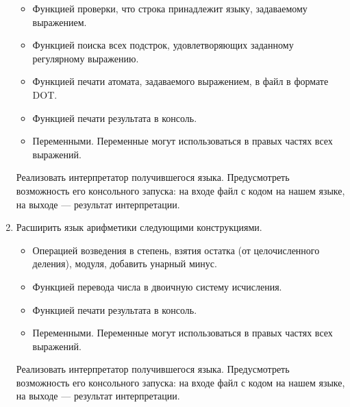 \begin{enumerate}
\begin{itemize}
    \item Функцией проверки, что строка принадлежит языку, задаваемому выражением. 
    \item Функцией поиска всех подстрок, удовлетворяющих заданному регулярному выражению.
    \item Функцией печати атомата, задаваемого выражением, в файл в формате DOT. 
    \item Функцией печати результата в консоль.
    \item Переменными. Переменные могут использоваться в правых частях всех выражений.
  \end{itemize} 
  Реализовать интерпретатор получившегося языка. Предусмотреть возможность его консольного запуска: на входе файл с кодом на нашем языке, на выходе --- результат интерпретации.
  \item Расширить язык арифметики следующими конструкциями.
  \begin{itemize}
    \item Операцией возведения в степень, взятия остатка (от целочисленного деления), модуля, добавить унарный минус.
    \item Функцией перевода числа в двоичную систему исчисления. 
    \item Функцией печати результата в консоль.
    \item Переменными. Переменные могут использоваться в правых частях всех выражений.
  \end{itemize} 
Реализовать интерпретатор получившегося языка. Предусмотреть возможность его консольного запуска: на входе файл с кодом на нашем языке, на выходе --- результат интерпретации.
 
\end{enumerate}
